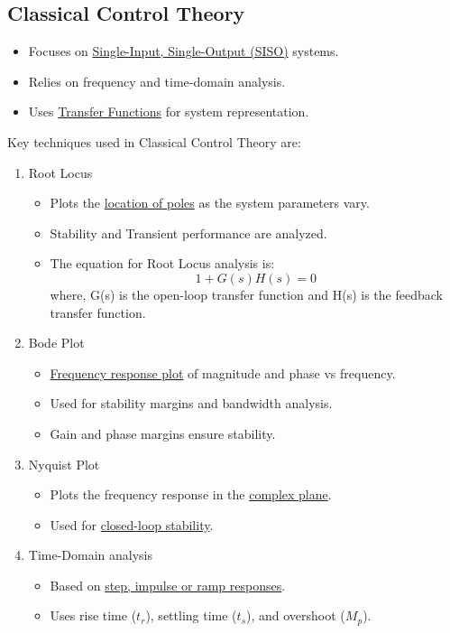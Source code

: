 \documentclass{article}
\begin{document}
\subsection{Classical Control Theory}
\begin{itemize}
    \item Focuses on \underline{Single-Input, Single-Output (SISO)} systems.
    \item Relies on frequency and time-domain analysis.
    \item Uses \underline{Transfer Functions} for system representation.
\end{itemize}
Key techniques used in Classical Control Theory are:
\begin{enumerate}
    \item Root Locus
        \begin{itemize}
            \item Plots the \underline{location of poles} as the system parameters vary.
            \item Stability and Transient performance are analyzed.
            \item The equation for Root Locus analysis is:            
                \[1 + G(s)H(s) = 0\]
            where, G(s) is the open-loop transfer function and H(s) is the feedback transfer function.
            \end{itemize}
    \item Bode Plot
        \begin{itemize}
            \item \underline{Frequency response plot} of magnitude and phase vs frequency.
            \item Used for stability margins and bandwidth analysis.
            \item Gain and phase margins ensure stability.
        \end{itemize}
    \item Nyquist Plot
            \begin{itemize}
                \item Plots the frequency response in the \underline{complex plane}.
                \item Used for \underline{closed-loop stability}.
            \end{itemize}
    \item Time-Domain analysis
        \begin{itemize}
            \item Based on \underline{step, impulse or ramp responses}.
            \item Uses rise time ($t_{r}$), settling time ($t_{s}$), and overshoot ($M_{p}$).
        \end{itemize}
\end{enumerate}
\end{document}

